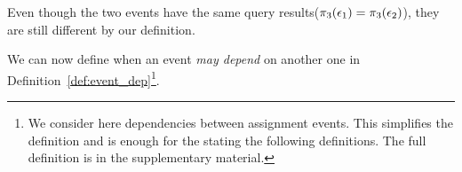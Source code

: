Even though the two events have the same query results($\pi_3(\mathtt{\epsilon}_1) = \pi_3(\mathtt{\epsilon}_2)$), they are still different by our definition.

We can now define when an event \emph{may depend} on another one in Definition~\ref{def:event_dep}\footnote{We consider here dependencies between assignment events. This simplifies the definition and is enough for the stating the following definitions. The full definition is in the supplementary material.}.

